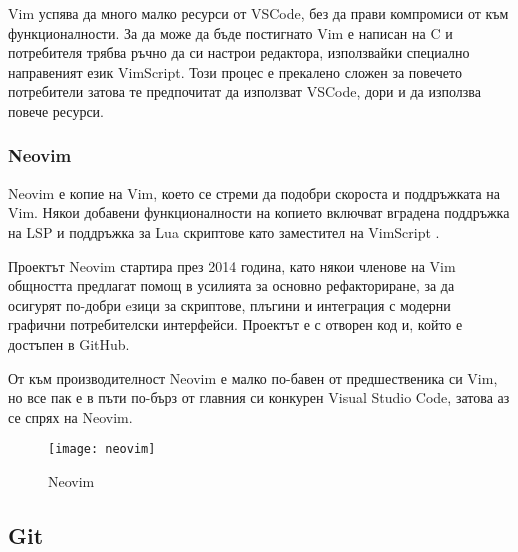 Vim успява да много малко ресурси от VSCode, без да прави компромиси от към
функционалности. За да може да бъде постигнато Vim е написан на C и потребителя
трябва ръчно да си настрои редактора, използвайки специално направеният език
VimScript. Този процес е прекалено сложен за повечето потребители затова те
предпочитат да използват VSCode, дори и да използва повече ресурси.

\subsubsection{Neovim}
Neovim е копие на Vim, което се стреми да подобри скороста и поддръжката на
Vim. Някои добавени функционалности на копието включват вградена поддръжка на
LSP и поддръжка за Lua скриптове като заместител на VimScript \cite{neovim_wikipedia}.

Проектът Neovim стартира през 2014 година, като някои членове на Vim общността
предлагат помощ в усилията за основно рефакториране, за да осигурят по-добри
eзици за скриптове, плъгини и интеграция с модерни графични потребителски интерфейси.
Проектът е с отворен код и, който е достъпен в GitHub. \cite{neovim_github}

От към производителност Neovim е малко по-бавен от предшественика си Vim, но
все пак е в пъти по-бърз от главния си конкурен Visual Studio Code, затова аз
се спрях на Neovim.

\begin{figure}[!htb]
  \texttt{[image: neovim]}
  \centering
  \caption{Neovim}
  \label{fig:neovim}
\end{figure}

\subsection{Git}

